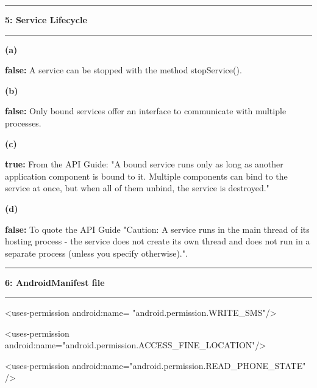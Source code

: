\documentclass[11pt]{article}
\newcommand\question[2]{\vspace{.25in}\hrule\textbf{#1: #2}\vspace{.5em}\hrule\vspace{.10in}}
\renewcommand\part[1]{\vspace{.10in}\textbf{(#1)}}
\begin{document}
\question{5}{Service Lifecycle} 

\part{a} 

\textbf{false:} A service can be stopped with the method stopService().

\part{b}

\textbf{false:} Only bound services offer an interface to communicate with multiple processes.

\part{c}

\textbf{true:} From the API Guide: "A bound service runs only as long as another application component is bound to it. Multiple components can bind to the service at once, but when all of them unbind, the service is destroyed."

\part{d}

\textbf{false:} To quote the API Guide "Caution: A service runs in the main thread of its hosting process - the service does not create its own thread and does not run in a separate process (unless you specify otherwise).".

\question{6}{AndroidManifest file}

 \textless uses-permission android:name= "android.permission.WRITE\_SMS"/\textgreater 
 
 
 \textless uses-permission android:name="android.permission.ACCESS\_FINE\_LOCATION"/\textgreater 
 
 
 \textless uses-permission android:name="android.permission.READ\_PHONE\_STATE" /\textgreater 
\end{document}
